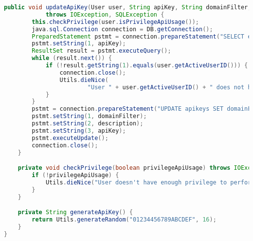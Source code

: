 \begin{lstlisting}[language=Java,basicstyle=\tiny,caption=models/ApiKeysManager.java,label={lst:ApiKeysManager.java}]
	public void updateApiKey(User user, String apiKey, String domainFilter, String description)
			throws IOException, SQLException {
		this.checkPrivilege(user.isPrivilegeApiUsage());
		java.sql.Connection connection = DB.getConnection();
		PreparedStatement pstmt = connection.prepareStatement("SELECT email FROM apikeys WHERE verifier=?");
		pstmt.setString(1, apiKey);
		ResultSet result = pstmt.executeQuery();
		while (result.next()) {
			if (!result.getString(1).equals(user.getActiveUserID())) {
				connection.close();
				Utils.dieNice(
						"User " + user.getActiveUserID() + " does not have privilege to update API Key " + apiKey + "");
			}
		}
		pstmt = connection.prepareStatement("UPDATE apikeys SET domainFilter=?, description=? WHERE verifier=?");
		pstmt.setString(1, domainFilter);
		pstmt.setString(2, description);
		pstmt.setString(3, apiKey);
		pstmt.executeUpdate();
		connection.close();
	}

	private void checkPrivilege(boolean privilegeApiUsage) throws IOException {
		if (!privilegeApiUsage) {
			Utils.dieNice("User doesn't have enough privilege to perform the action.");
		}
	}

	private String generateApiKey() {
		return Utils.generateRandom("01234456789ABCDEF", 16);
	}
}
\end{lstlisting}

